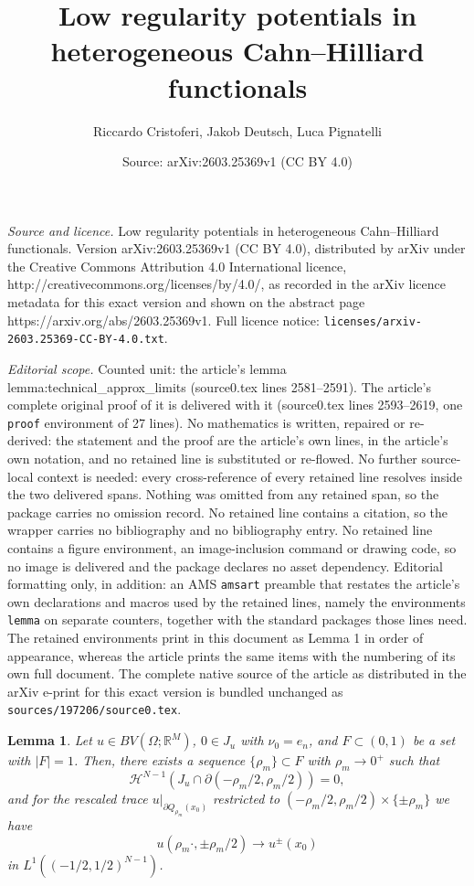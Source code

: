 \documentclass[10pt,a4paper]{amsart}
\title{Low regularity potentials in heterogeneous Cahn--Hilliard functionals}
\author{Riccardo Cristoferi, Jakob Deutsch, Luca Pignatelli}
\date{Source: arXiv:2603.25369v1 (CC BY 4.0)}
\newtheorem{lemma}{Lemma}
\renewcommand{\H}{\mathcal H}
\newcommand{\R}{\mathbb R}
\begin{document}
\maketitle

\noindent\emph{Source and licence.} Low regularity potentials in heterogeneous Cahn--Hilliard functionals. Version arXiv:2603.25369v1 (CC BY 4.0), distributed by arXiv under the Creative Commons Attribution 4.0 International licence, http://creativecommons.org/licenses/by/4.0/, as recorded in the arXiv licence metadata for this exact version and shown on the abstract page https://arxiv.org/abs/2603.25369v1. Full licence notice: \texttt{licenses/arxiv-2603.25369-CC-BY-4.0.txt}.\par\smallskip

\noindent\textit{Editorial scope.} Counted unit: the article's lemma lemma:technical\_approx\_limits (source0.tex lines 2581--2591). The article's complete original proof of it is delivered with it (source0.tex lines 2593--2619, one \texttt{proof} environment of 27 lines). No mathematics is written, repaired or re-derived: the statement and the proof are the article's own lines, in the article's own notation, and no retained line is substituted or re-flowed.  No further source-local context is needed: every cross-reference of every retained line resolves inside the two delivered spans.  Nothing was omitted from any retained span, so the package carries no omission record.  No retained line contains a citation, so the wrapper carries no bibliography and no bibliography entry.  No retained line contains a figure environment, an image-inclusion command or drawing code, so no image is delivered and the package declares no asset dependency.  Editorial formatting only, in addition: an AMS \texttt{amsart} preamble that restates the article's own declarations and macros used by the retained lines, namely the environments \texttt{lemma} on separate counters, together with the standard packages those lines need.  The retained environments print in this document as Lemma 1 in order of appearance, whereas the article prints the same items with the numbering of its own full document.  The complete native source of the article as distributed in the arXiv e-print for this exact version is bundled unchanged as \texttt{sources/197206/source0.tex}.
    \begin{lemma}\label{lemma:technical_approx_limits}
        Let $u \in BV(\Omega; \R^M)$, $0 \in J_u$ with $\nu_{0} = e_n$, and $F \subset (0,1)$ be a set with $|F| = 1$. Then, there exists a sequence $\{\rho_m\} \subset F$ with $\rho_m \to 0^+$ such that 
        \[
            \H^{N-1}(J_u \cap \partial (-\rho_m/2, \rho_m/2)) = 0,
        \]
        and for the rescaled trace $u|_{\partial Q_{\rho_m}(x_0)}$ restricted to $(-\rho_m/2, \rho_m/2)\times \{\pm \rho_m\}$ we have 
        \[
            u(\rho_m \cdot, \pm \rho_m/2) \to u^\pm(x_0)
        \]
        in $L^1((-1/2, 1/2)^{N-1})$.
    \end{lemma}
\end{document}
